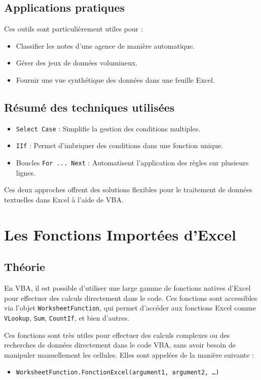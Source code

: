 \documentclass[a4paper,12pt]{report}
\begin{document}
\section{Applications pratiques}

Ces outils sont particulièrement utiles pour :
\begin{itemize}
	\item Classifier les notes d'une agence de manière automatique.
	\item Gérer des jeux de données volumineux.
	\item Fournir une vue synthétique des données dans une feuille Excel.
\end{itemize}

\section{Résumé des techniques utilisées}

\begin{itemize}
	\item \texttt{Select Case} : Simplifie la gestion des conditions multiples.
	\item \texttt{IIf} : Permet d'imbriquer des conditions dans une fonction unique.
	\item Boucles \texttt{For ... Next} : Automatisent l'application des règles sur plusieurs lignes.
\end{itemize}

Ces deux approches offrent des solutions flexibles pour le traitement de données textuelles dans Excel à l'aide de VBA.


\chapter{Les Fonctions Importées d'Excel}

\section{Théorie}
En VBA, il est possible d'utiliser une large gamme de fonctions natives d'Excel pour effectuer des calculs directement dans le code. Ces fonctions sont accessibles via l'objet \texttt{WorksheetFunction}, qui permet d'accéder aux fonctions Excel comme \texttt{VLookup}, \texttt{Sum}, \texttt{CountIf}, et bien d'autres.

Ces fonctions sont très utiles pour effectuer des calculs complexes ou des recherches de données directement dans le code VBA, sans avoir besoin de manipuler manuellement les cellules. Elles sont appelées de la manière suivante :
\begin{itemize}
	\item \texttt{WorksheetFunction.FonctionExcel(argument1, argument2, \dots)}
\end{itemize}
\end{document}
